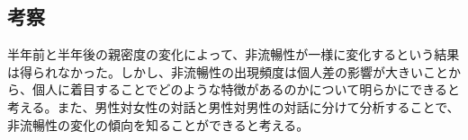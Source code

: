 \newpage

\subsection{考察}
半年前と半年後の親密度の変化によって、非流暢性が一様に変化するという結果は得られなかった。しかし、非流暢性の出現頻度は個人差の影響が大きいことから、個人に着目することでどのような特徴があるのかについて明らかにできると考える。また、男性対女性の対話と男性対男性の対話に分けて分析することで、非流暢性の変化の傾向を知ることができると考える。


